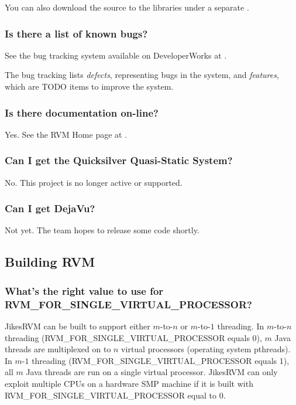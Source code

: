 You can also download the source to the libraries under
a separate 
.

\subsubsection{Is there a list of known bugs?}

See the bug tracking system available on DeveloperWorks at 
\xlink{{\tt \RVMBugURL}}{\RVMBugURL}.

The bug tracking lists {\em defects}, representing bugs in the system, and
{\em features}, which are TODO items to improve the system.

\subsubsection{Is there documentation on-line?}

Yes.  See the RVM Home page at
\xlink{{\tt \RVMHomeURL}}{\RVMHomeURL}.

\subsubsection{Can I get the Quicksilver Quasi-Static System?}

No. This project is no longer active or supported.

\subsubsection{Can I get DejaVu?}

Not yet.  The  team hopes to 
release some code shortly.

\subsection{Building RVM}


\subsubsection{What's the right value to use for
RVM\_FOR\_SINGLE\_VIRTUAL\_PROCESSOR?} 

JikesRVM can be built to support either $m$-to-$n$ or $m$-to-$1$
threading.  In $m$-to-$n$ threading
(RVM\_FOR\_SINGLE\_VIRTUAL\_PROCESSOR equals 0), $m$ Java threads are
multiplexed on to $n$ virtual processors (operating system pthreads).
In $m$-$1$ threading (RVM\_FOR\_SINGLE\_VIRTUAL\_PROCESSOR equals 1),
all $m$ Java threads are run on a single virtual processor.  JikesRVM
can only exploit multiple CPUs on a hardware SMP machine if it is
built with RVM\_FOR\_SINGLE\_VIRTUAL\_PROCESSOR equal to 0.

